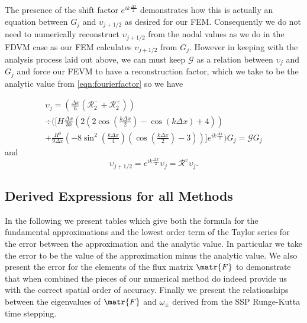 The presence of the shift factor $e^{ik\frac{\Delta x}{2}}$ demonstrates how this is actually an equation between $G_j$ and $\upsilon_{j+1/2}$ as desired for our FEM. Consequently we do not need to numerically reconstruct $\upsilon_{j+1/2}$ from the nodal values as we do in the FDVM case as our FEM calculates $\upsilon_{j+1/2}$ from $G_j$. However in keeping with the analysis process laid out above, we can must keep $\mathcal{G}$ as a relation between $\upsilon_j$ and $G_j$ and force our FEVM to have a reconstruction factor, which we take to be the analytic value from \eqref{eqn:fourierfactor} so we have

  \begin{multline*}
  \upsilon_j =  \left(\frac{\Delta x}{6} \left(\mathcal{R}^-_2 + \mathcal{R}^+_2 \right)\right) \\ \div  \Bigg(\Bigg[H\frac{\Delta x}{30} \left( 2\left(2\cos\left(\frac{k \Delta x}{2}\right) - \cos\left({k \Delta x}\right) + 4\right)  \right)  \\+ \frac{H^3 }{9\Delta x} \left(-8 \sin^2\left(\frac{k \Delta x}{4}\right)\left(\cos\left(\frac{k \Delta x}{2}\right) - 3 \right)  \right)      \Big]e^{ik\frac{\Delta x}{2}} \Bigg) G_j = \mathcal{G} G_j
  \end{multline*}
  and
\begin{equation*}
\upsilon_{j+1/2} =   e^{ik\frac{\Delta x}{2}} \upsilon_j =   \mathcal{R}^\upsilon \upsilon_j.
\end{equation*}
 

\subsection{Derived Expressions for all Methods}
\label{subsec:TabFacdisp}
In the following we present tables which give both the formula for the fundamental approximations and the lowest order term of the Taylor series for the error between the approximation and the analytic value. In particular we take the error to be the value of the approximation minus the analytic value. We also present the error for the elements of the flux matrix $\matr{F}$ to demonstrate that when combined the pieces of our numerical method do indeed provide us with the correct spatial order of accuracy. Finally we present the relationships between the eigenvalues of $\matr{F}$ and $\omega_\pm$ derived from the SSP Runge-Kutta time stepping.


